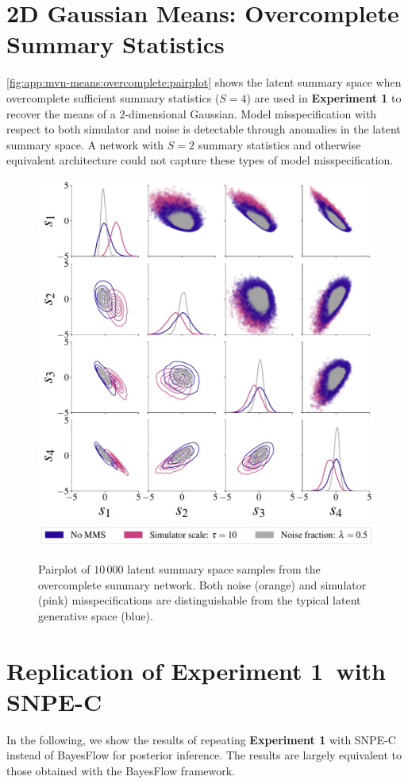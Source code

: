 \documentclass[twoside,11pt]{article}
\newcommand{\numberGaussianMeans}{1}
\newcommand{\0}{\boldsymbol{0}}
\begin{document}
\section{2D Gaussian Means: Overcomplete Summary Statistics}


\autoref{fig:app:mvn-means:overcomplete:pairplot} shows the latent summary space when overcomplete sufficient summary statistics ($S=4$) are used in \textbf{Experiment \numberGaussianMeans} to recover the means of a $2$-dimensional Gaussian.
Model misspecification with respect to both simulator and noise is detectable through anomalies in the latent summary space.
A network with $S=2$ summary statistics and otherwise equivalent architecture could not capture these types of model misspecification. 

\begin{figure}[t]
    \centering
    \includegraphics[width=.46\linewidth]{plots/abf_mvn_means_overcomplete_pairplot.pdf}\\
    \includegraphics[width=0.7\linewidth]{plots/abf_mvn_means_overcomplete_pairplot_MMD_legend.pdf}
    \caption{Pairplot of $10\,000$ latent summary space samples from the overcomplete summary network. Both noise (orange) and simulator (pink) misspecifications are distinguishable from the typical latent generative space (blue).}
    \label{fig:app:mvn-means:overcomplete:pairplot}
\end{figure}


\section{Replication of Experiment \numberGaussianMeans~with SNPE-C}
\label{app:snpe}

In the following, we show the results of repeating \textbf{Experiment \numberGaussianMeans} with SNPE-C \citep[APT; ][]{apt} instead of BayesFlow for posterior inference.
The results are largely equivalent to those obtained with the BayesFlow framework.
\end{document}
